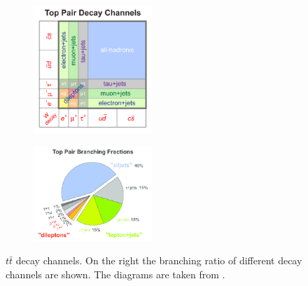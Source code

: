 \begin{figure}[h]
\centering
\begin{subfigure}
  \centering
  \includegraphics[width=0.49\textwidth]{01_Theory_SM/plots/top_pair_decay_channels.png}
\end{subfigure}
\begin{subfigure}
  \centering
  \includegraphics[width=0.49\textwidth]{01_Theory_SM/plots/top_pair_branching_frac.png}
\end{subfigure}
\caption{$t\bar{t}$ decay channels. On the right the branching ratio of different decay channels are shown. The diagrams are taken from \cite{UsefulDiagrams}.}
  \label{fig:tt_decay}
\end{figure}

